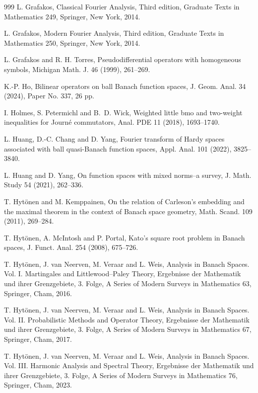\documentclass[11pt, reqno]{amsart}
\theoremstyle{definition}
\theoremstyle{remark}
\numberwithin{equation}{section}
\begin{document}
\begin{thebibliography}{999}
L. Grafakos,
Classical Fourier Analysis, Third edition,
Graduate Texts in Mathematics 249, Springer, New York, 2014.

L. Grafakos,
Modern Fourier Analysis, Third edition,
Graduate Texts in Mathematics 250, Springer, New York, 2014.

L. Grafakos and R. H. Torres,
Pseudodifferential operators with homogeneous symbols,
Michigan Math. J. 46 (1999), 261--269.

K.-P. Ho,
Bilinear operators on ball Banach function spaces,
J. Geom. Anal. 34 (2024), Paper No. 337, 26 pp.

I. Holmes, S. Petermichl and B.~D. Wick,
Weighted little bmo and two-weight inequalities for Journ\'e commutators,
Anal. PDE 11 (2018), 1693--1740.

L. Huang, D.-C. Chang and D. Yang,
Fourier transform of Hardy spaces associated with ball quasi-Banach function spaces,
Appl. Anal. 101 (2022), 3825--3840.

L. Huang and D. Yang,
On function spaces with mixed norms--a survey,
J. Math. Study 54 (2021), 262--336.

T. Hyt\"onen and M. Kemppainen,
On the relation of Carleson's embedding and the maximal theorem
in the context of Banach space geometry,
Math. Scand. 109 (2011), 269--284.

T. Hyt\"onen, A. McIntosh and P. Portal,
Kato's square root problem in Banach spaces,
J. Funct. Anal. 254 (2008), 675--726.

T. Hyt\"onen, J. van Neerven, M. Veraar and L. Weis,
Analysis in Banach Spaces. Vol. I. Martingales and Littlewood--Paley Theory,
Ergebnisse der Mathematik und ihrer Grenzgebiete, 3. Folge,
A Series of Modern Surveys in Mathematics 63, Springer, Cham, 2016.

T. Hyt\"onen, J. van Neerven, M. Veraar and L. Weis,
Analysis in Banach Spaces. Vol. II. Probabilistic Methods and Operator Theory,
Ergebnisse der Mathematik und ihrer Grenzgebiete, 3. Folge,
A Series of Modern Surveys in Mathematics 67, Springer, Cham, 2017.

T. Hyt\"onen, J. van Neerven, M. Veraar and L. Weis,
Analysis in Banach Spaces. Vol. III. Harmonic Analysis and Spectral Theory,
Ergebnisse der Mathematik und ihrer Grenzgebiete, 3. Folge,
A Series of Modern Surveys in Mathematics 76, Springer, Cham, 2023.


\end{thebibliography}
\end{document}
